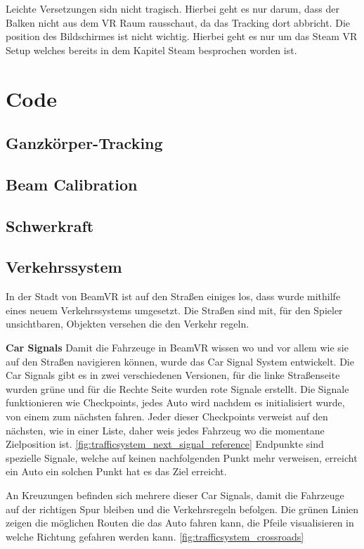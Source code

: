 Leichte Versetzungen sidn nicht tragisch. Hierbei geht es nur darum, dass der Balken nicht aus dem VR Raum
rausschaut, da das Tracking dort abbricht. Die position des Bildschirmes ist nicht wichtig.
Hierbei geht es nur um das Steam VR Setup welches bereits in dem Kapitel Steam besprochen worden ist.

\section{Code}\label{sec:code}
\subsection{Ganzkörper-Tracking}\label{sec:full-body-tracking}
\subsection{Beam Calibration}\label{subsec:beam-calibration}
\subsection{Schwerkraft}\label{subsec:gravity}
\subsection{Verkehrssystem}\label{subsec:traffic-system}
In der Stadt von BeamVR ist auf den Straßen einiges los, dass wurde mithilfe eines neuem Verkehrssystems umgesetzt.
Die Straßen sind mit, f\"ur den Spieler unsichtbaren, Objekten versehen die den Verkehr regeln.

\textbf{Car Signals}
Damit die Fahrzeuge in BeamVR wissen wo und vor allem wie sie auf den Straßen navigieren k\"onnen, wurde das Car Signal System entwickelt.
Die Car Signals gibt es in zwei verschiedenen Versionen, f\"ur die linke Straßenseite wurden gr\"une und f\"ur die Rechte Seite wurden rote Signale erstellt.
Die Signale funktionieren wie Checkpoints, jedes Auto wird nachdem es initialisiert wurde, von einem zum n\"achsten fahren.
Jeder dieser Checkpoints verweist auf den nächsten, wie in einer Liste, daher weis jedes Fahrzeug wo die momentane Zielposition ist.
\ref{fig:trafficsystem_next_signal_reference}
Endpunkte sind spezielle Signale, welche auf keinen nachfolgenden Punkt mehr verweisen, erreicht ein Auto ein solchen Punkt hat es das Ziel erreicht.

An Kreuzungen befinden sich mehrere dieser Car Signals, damit die Fahrzeuge auf der richtigen Spur bleiben und die Verkehrsregeln befolgen.
Die gr\"unen Linien zeigen die m\"oglichen Routen die das Auto fahren kann, die Pfeile visualisieren in welche Richtung gefahren werden kann.
\ref{fig:trafficsystem_crossroads}



